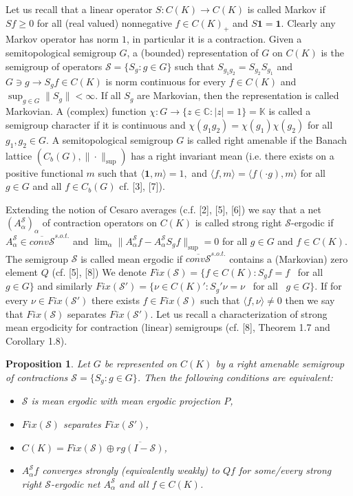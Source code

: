\documentclass{amsart}
\newtheorem{prop}[thm]{Proposition}
\theoremstyle{definition}
\theoremstyle{remark}
\numberwithin{equation}{section}
\begin{document}
Let us recall that a linear operator $S : C(K) \to C(K)$ is called Markov if
$Sf\geq 0$ for all (real valued) nonnegative  $f\in C(K)_+$ and $S\mathbf{1} = \mathbf{1}$.
Clearly any Markov operator has norm $1$, in particular it is a contraction.
Given a semitopological semigroup $G$, a (bounded) representation of $G$ on $C(K)$ is
the semigroup of operators $\mathcal{S} = \{ S_g : g\in G \}$ such that
$S_{g_1g_2} = S_{g_2}S_{g_1}$ and $G \ni g \to S_gf \in C(K)$ is norm continuous for every
$f\in C(K)$ and $\sup_{g\in G} \| S_g \| < \infty$. If all $S_g$ are Markovian, then the representation
is called Markovian.
A (complex) function $\chi : G \to \{ z\in \mathbb{C} : |z| = 1 \} = \mathbb{K} $
is called a semigroup character if it is continuous and $\chi(g_1g_2) = \chi (g_1)\chi (g_2)$ for
all $g_1, g_2 \in G$. A semitopological semigroup $G$ is called right amenable
if the Banach lattice  $(C_b(G), \| \cdot \|_{\sup}) $ has a right invariant mean (i.e. there
exists on  a positive functional $m$ such that $\langle \mathbf{1} , m \rangle  = 1, $
and $\langle f, m \rangle = \langle f(\cdot g), m \rangle  $ for all $g\in G $ and all $f\in C_b(G)$
cf. [3], [7]).

Extending the notion of Cesaro averages (c.f. [2], [5], [6]) we say that
a net $(A_{\alpha }^{\mathcal{S}})_{\alpha }$ of contraction operators on $C(K)$
is called strong right $\mathcal{S}$-ergodic if
$A_{\alpha}^{\mathcal{S}} \in \overline{conv\mathcal{S}}^{s.o.t.}$ and
$\lim_{\alpha} \| A_{\alpha}^{\mathcal{S}}f -  A_{\alpha}^{\mathcal{S}}S_gf \|_{\sup} = 0$
for all $g\in G$ and $f\in C(K)$. The semigroup $\mathcal{S}$ is called mean ergodic if
$\overline{conv \mathcal{S}}^{s.o.t.}$ contains a (Markovian) zero element $Q$ (cf. [5], [8])
We denote $Fix(\mathcal{S}) = \{ f\in C(K) : S_gf = f  $ \ for all \ $g\in G \}$ and similarly
$Fix(\mathcal{S}') = \{ \nu\in C(K)' : S_g'\nu  = \nu  $ \ for all \ $g\in G \}$. If
for every $\nu \in Fix(\mathcal{S}')$ there exists $f\in Fix(\mathcal{S})$
such that $\langle f , \nu \rangle \neq 0 $ then we say that
$Fix(\mathcal{S})$ separates $Fix(\mathcal{S}')$.
Let us recall a characterization of strong mean ergodicity
for contraction (linear) semigroups (cf. [8], Theorem 1.7 and Corollary 1.8).
\begin{prop}
Let $G$ be represented on $C(K)$ by a right amenable semigroup of contractions
$\mathcal{S} = \{ S_g : g \in G \}$. Then the following conditions are equivalent:
\begin{itemize}
\item[(1)] $\mathcal{S}$ is mean ergodic with mean ergodic projection $P$,
\item[(2)] $Fix(\mathcal{S})$ separates $Fix(\mathcal{S}')$,
\item[(3)] $C(K) = Fix(\mathcal{S})\oplus \overline{rg(I - \mathcal{S})} $,
\item[(4)] $A_{\alpha}^{\mathcal{S}}f$ converges strongly (equivalently weakly)
to $Qf$ for some/every strong right $\mathcal{S}$-ergodic net
$A_{\alpha}^{\mathcal{S}}$ and all $f\in C(K)$.
\end{itemize}
\end{prop}
\end{document}
